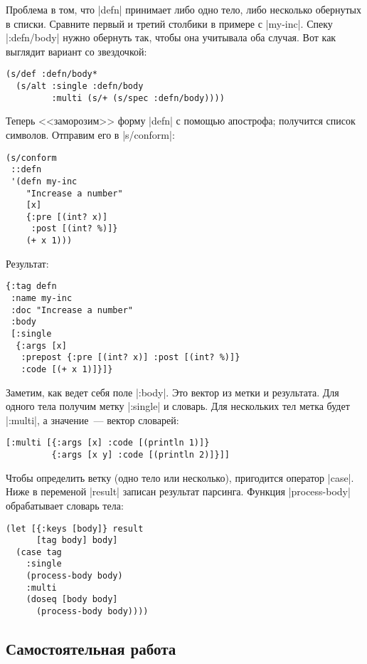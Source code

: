 Проблема в том, что \spverb|defn| принимает либо одно тело, либо несколько
обернутых в списки. Сравните первый и третий столбики в примере с
\spverb|my-inc|. Спеку \spverb|:defn/body| нужно обернуть так, чтобы она
учитывала оба случая. Вот как выглядит вариант со звездочкой:

\begin{verbatim}
(s/def :defn/body*
  (s/alt :single :defn/body
         :multi (s/+ (s/spec :defn/body))))
\end{verbatim}

Теперь <<заморозим>> форму \spverb|defn| с помощью апострофа; получится список
символов. Отправим его в \spverb|s/conform|:

\begin{verbatim}
(s/conform
 ::defn
 '(defn my-inc
    "Increase a number"
    [x]
    {:pre [(int? x)]
     :post [(int? %)]}
    (+ x 1)))
\end{verbatim}

\noindent
Результат:

\begin{verbatim}
{:tag defn
 :name my-inc
 :doc "Increase a number"
 :body
 [:single
  {:args [x]
   :prepost {:pre [(int? x)] :post [(int? %)]}
   :code [(+ x 1)]}]}
\end{verbatim}

Заметим, как ведет себя поле \spverb|:body|. Это вектор из метки и
результата. Для одного тела получим метку \spverb|:single| и словарь. Для
нескольких тел метка будет \spverb|:multi|, а значение~--- вектор словарей:

\begin{verbatim}
[:multi [{:args [x] :code [(println 1)]}
         {:args [x y] :code [(println 2)]}]]
\end{verbatim}

Чтобы определить ветку (одно тело или несколько), пригодится оператор
\spverb|case|. Ниже в переменой \spverb|result| записан результат
парсинга. Функция \spverb|process-body| обрабатывает словарь тела:

\begin{verbatim}
(let [{:keys [body]} result
      [tag body] body]
  (case tag
    :single
    (process-body body)
    :multi
    (doseq [body body]
      (process-body body))))
\end{verbatim}

\subsection{Самостоятельная работа}

